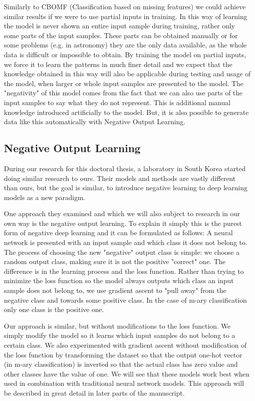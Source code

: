 \documentclass[b5paper]{book}
\begin{document}
Similarly to CBOMF (Classification based on missing features) we could achieve similar results if we were to use partial inputs in training. In this way of learning the model is never shown an entire input sample during training, rather only some parts of the input samples. These parts can be obtained manually or for some problems (e.g. in astronomy) they are the only data available, as the whole data is difficult or impossible to obtain. By training the model on partial inputs, we force it to learn the patterns in much finer detail and we expect that the knowledge obtained in this way will also be applicable during testing and usage of the model, when larger or whole input samples are presented to the model. The "negativity" of this model comes from the fact that we can also use parts of the input samples to say what they do not represent. This is additional manual knowledge introduced artificially to the model. But, it is also possible to generate data like this automatically with Negative Output Learning.

\subsection{Negative Output Learning}

During our research for this doctoral thesis, a laboratory in South Korea started doing similar research to ours. Their models and methods are vastly different than ours, but the goal is similar, to introduce negative learning to deep learning models as a new paradigm. 

One approach they examined and which we will also subject to research in our own way is the negative output learning. To explain it simply this is the purest form of negative deep learning and it can be formulated as follows: A neural network is presented with an input sample and which class it does not belong to. The process of choosing the new "negative" output class is simple: we choose a random output class, making sure it is not the positive "correct" one. The difference is in the learning process and the loss function. Rather than trying to minimize the loss function so the model always outputs which class an input sample does not belong to, we use gradient ascent to "pull away" from the negative class and towards some positive class. In the case of m-ary classification only one class is the positive one.

Our approach is similar, but without modifications to the loss function. We simply modify the model so it learns which input samples do not belong to a certain class. We also experimented with gradient ascent without modification of the loss function by transforming the dataset so that the output one-hot vector (in m-ary classification) is inverted so that the actual class has zero value and other classes have the value of one. We will see that these models work best when used in combination with traditional neural network models. This approach will be described in great detail in later parts of the manuscript.
\end{document}
